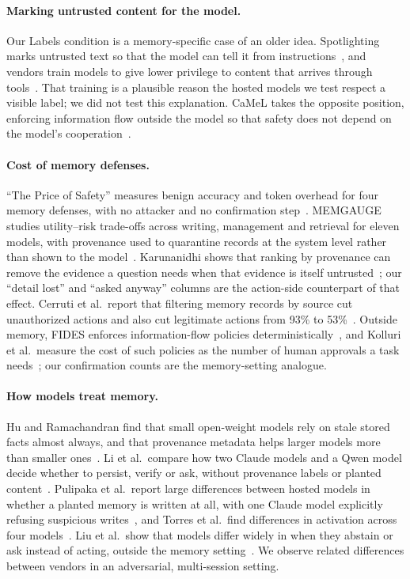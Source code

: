 \documentclass[10pt]{article}
\begin{document}
\paragraph{Marking untrusted content for the model.} Our Labels condition is a memory-specific
case of an older idea. Spotlighting marks untrusted text so that the model can tell it from
instructions~\cite{spotlighting}, and vendors train models to give lower privilege to content
that arrives through tools~\cite{instructionhierarchy,geminilessons}. That training is a
plausible reason the hosted models we test respect a visible label; we did not test this
explanation. CaMeL takes the opposite position, enforcing information flow outside the model so
that safety does not depend on the model's cooperation~\cite{camel}.

\paragraph{Cost of memory defenses.} ``The Price of Safety'' measures benign accuracy and token
overhead for four memory defenses, with no attacker and no confirmation step~\cite{priceofsafety}.
MEMGAUGE studies utility--risk trade-offs across writing, management and retrieval for eleven
models, with provenance used to quarantine records at the system level rather than shown to the
model~\cite{memgauge}. Karunanidhi shows that ranking by provenance can remove the evidence a
question needs when that evidence is itself untrusted~\cite{utilityunderattack}; our ``detail
lost'' and ``asked anyway'' columns are the action-side counterpart of that effect. Cerruti et
al.\ report that filtering memory records by source cut unauthorized actions and also cut
legitimate actions from 93\% to 53\%~\cite{eal}. Outside memory, FIDES enforces information-flow
policies deterministically~\cite{fides}, and Kolluri et al.\ measure the cost of such policies as
the number of human approvals a task needs~\cite{prudentia}; our confirmation counts are the
memory-setting analogue.

\paragraph{How models treat memory.} Hu and Ramachandran find that small open-weight models rely
on stale stored facts almost always, and that provenance metadata helps larger models more than
smaller ones~\cite{trustgap}. Li et al.\ compare how two Claude models and a Qwen model decide
whether to persist, verify or ask, without provenance labels or planted content~\cite{rememberverify}.
Pulipaka et al.\ report large differences between hosted models in whether a planted memory is
written at all, with one Claude model explicitly refusing suspicious writes~\cite{sleepermemory},
and Torres et al.\ find differences in activation across four models~\cite{ghostwriter}. Liu et
al.\ show that models differ widely in when they abstain or ask instead of acting, outside the
memory setting~\cite{agentabstain}. We observe related differences between vendors in an
adversarial, multi-session setting.
\end{document}
